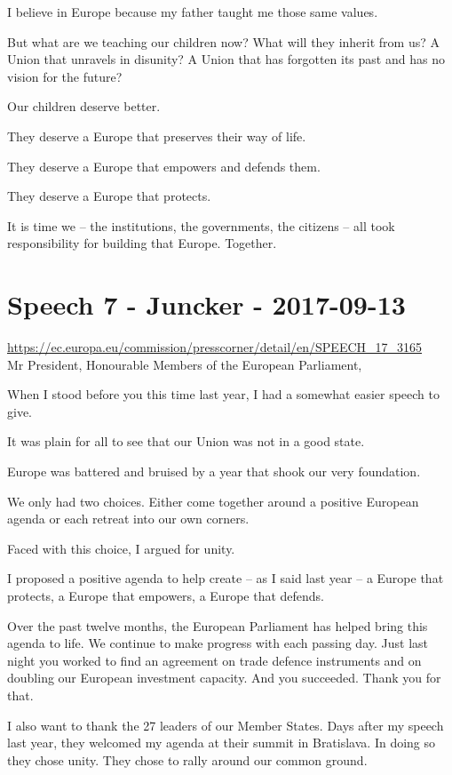 \documentclass[a4paper,11pt]{article}
\begin{document}
I believe in Europe because my father taught me those same values.

But what are we teaching our children now? What will they inherit from us? A Union that unravels in disunity? A Union that has forgotten its past and has no vision for the future?

Our children deserve better.

They deserve a Europe that preserves their way of life.

They deserve a Europe that empowers and defends them.

They deserve a Europe that protects.

It is time we – the institutions, the governments, the citizens – all took responsibility for building that Europe. Together.
 \newpage\section{Speech 7 - Juncker - 2017-09-13}
\url{https://ec.europa.eu/commission/presscorner/detail/en/SPEECH_17_3165}\\[3mm]
Mr President, Honourable Members of the European Parliament,

When I stood before you this time last year, I had a somewhat easier speech to give.

It was plain for all to see that our Union was not in a good state.

Europe was battered and bruised by a year that shook our very foundation.

We only had two choices. Either come together around a positive European agenda or each retreat into our own corners.

Faced with this choice, I argued for unity.

I proposed a positive agenda to help create – as I said last year – a Europe that protects, a Europe that empowers, a Europe that defends.

Over the past twelve months, the European Parliament has helped bring this agenda to life. We continue to make progress with each passing day. Just last night you worked to find an agreement on trade defence instruments and on doubling our European investment capacity. And you succeeded. Thank you for that.

I also want to thank the 27 leaders of our Member States. Days after my speech last year, they welcomed my agenda at their summit in Bratislava. In doing so they chose unity. They chose to rally around our common ground.
\end{document}
